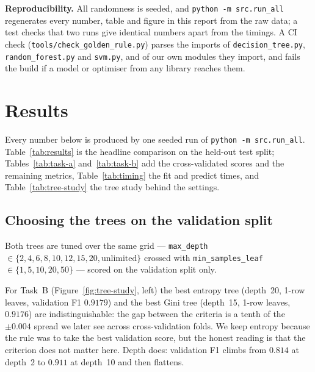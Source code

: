 \documentclass[10pt,twocolumn,a4paper]{article}
\begin{document}
\textbf{Reproducibility.} All randomness is seeded, and
\texttt{python -m src.run\_all} regenerates every number, table and figure
in this report from the raw data; a test checks that two runs give identical
numbers apart from the timings. A CI check
(\texttt{tools/check\_golden\_rule.py}) parses the imports of
\texttt{decision\_tree.py}, \texttt{random\_forest.py} and \texttt{svm.py},
and of our own modules they import, and fails the build if a model or
optimiser from any library reaches them.

\section{Results}
\label{sec:results}
Every number below is produced by one seeded run of
\texttt{python -m src.run\_all}. Table~\ref{tab:results} is the headline
comparison on the held-out test split; Tables~\ref{tab:task-a}
and~\ref{tab:task-b} add the cross-validated scores and the remaining
metrics, Table~\ref{tab:timing} the fit and predict times, and
Table~\ref{tab:tree-study} the tree study behind the settings.

\subsection{Choosing the trees on the validation split}
Both trees are tuned over the same grid --- \texttt{max\_depth} $\in\{2, 4, 6,
8, 10, 12, 15, 20, \text{unlimited}\}$ crossed with
\texttt{min\_samples\_leaf} $\in\{1, 5, 10, 20, 50\}$ --- scored on the
validation split only.

For Task~B (Figure~\ref{fig:tree-study}, left) the best entropy tree
(depth~20, 1-row leaves, validation F1 $0.9179$) and the best Gini tree
(depth~15, 1-row leaves, $0.9176$) are indistinguishable: the gap between the
criteria is a tenth of the $\pm0.004$ spread we later see across
cross-validation folds. We keep entropy because the rule was to take the best
validation score, but the honest reading is that the criterion does not
matter here. Depth does: validation F1 climbs from $0.814$ at depth~2 to
$0.911$ at depth~10 and then flattens.
\end{document}
